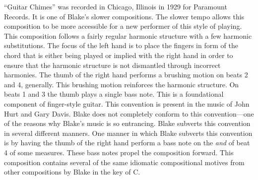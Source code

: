 \documentclass{tufte-handout}
\begin{document}
``Guitar Chimes'' was recorded in Chicago, Illinois in 1929 for Paramount Records. It is one of Blake's slower compositions. The slower tempo allows this composition to be more accessible for a new performer of this style of playing. This composition follows a fairly regular harmonic structure with a few harmonic substitutions. The focus of the left hand is to place the fingers in form of the chord that is either being played or implied with the right hand in order to ensure that the harmonic structure is not dismantled through incorrect harmonies. The thumb of the right hand performs a brushing motion on beats 2 and 4, generally. This brushing motion reinforces the harmonic structure. On beats 1 and 3 the thumb plays a single bass note. This is a foundational component of finger-style guitar. This convention is present in the music of John Hurt and Gary Davis. Blake does not completely conform to this convention---one of the reasons why Blake's music is so entrancing. Blake subverts this convention in several different manners. One manner in which Blake subverts this convention is by having the thumb of the right hand perform a bass note on the \emph{and} of beat 4 of some measures. These bass notes propel the composition forward. This composition contains several of the same idiomatic compositional motives from other compositions by Blake in the key of C.
\end{document}
